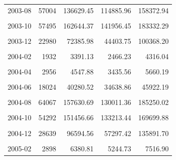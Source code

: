 \begin{longtable}[t]{crrrr}
2003-08 & 57004 & 136629.45 & 114885.96 & 158372.94\\
\cellcolor{gray!10}{2003-09} & \cellcolor{gray!10}{97758} & \cellcolor{gray!10}{305283.59} & \cellcolor{gray!10}{276922.92} & \cellcolor{gray!10}{333644.26}\\
2003-10 & 57495 & 162644.37 & 141956.45 & 183332.29\\
\cellcolor{gray!10}{2003-11} & \cellcolor{gray!10}{35421} & \cellcolor{gray!10}{97129.30} & \cellcolor{gray!10}{75538.30} & \cellcolor{gray!10}{118720.30}\\
2003-12 & 22980 & 72385.98 & 44403.75 & 100368.20\\
\cellcolor{gray!10}{2004-01} & \cellcolor{gray!10}{3883} & \cellcolor{gray!10}{7806.18} & \cellcolor{gray!10}{5963.34} & \cellcolor{gray!10}{9649.03}\\
2004-02 & 1932 & 3391.13 & 2466.23 & 4316.04\\
\cellcolor{gray!10}{2004-03} & \cellcolor{gray!10}{2928} & \cellcolor{gray!10}{6763.17} & \cellcolor{gray!10}{5453.68} & \cellcolor{gray!10}{8072.65}\\
2004-04 & 2956 & 4547.88 & 3435.56 & 5660.19\\
\cellcolor{gray!10}{2004-05} & \cellcolor{gray!10}{6609} & \cellcolor{gray!10}{12522.68} & \cellcolor{gray!10}{11276.84} & \cellcolor{gray!10}{13768.52}\\
2004-06 & 18024 & 40280.52 & 34638.86 & 45922.19\\
\cellcolor{gray!10}{2004-07} & \cellcolor{gray!10}{30356} & \cellcolor{gray!10}{32930.33} & \cellcolor{gray!10}{22640.49} & \cellcolor{gray!10}{43220.17}\\
2004-08 & 64067 & 157630.69 & 130011.36 & 185250.02\\
\cellcolor{gray!10}{2004-09} & \cellcolor{gray!10}{121395} & \cellcolor{gray!10}{397710.45} & \cellcolor{gray!10}{355456.84} & \cellcolor{gray!10}{439964.07}\\
2004-10 & 54292 & 151456.66 & 133213.44 & 169699.88\\
\cellcolor{gray!10}{2004-11} & \cellcolor{gray!10}{45364} & \cellcolor{gray!10}{135278.13} & \cellcolor{gray!10}{101751.35} & \cellcolor{gray!10}{168804.91}\\
2004-12 & 28639 & 96594.56 & 57297.42 & 135891.70\\
\cellcolor{gray!10}{2005-01} & \cellcolor{gray!10}{7057} & \cellcolor{gray!10}{19785.22} & \cellcolor{gray!10}{13758.82} & \cellcolor{gray!10}{25811.61}\\
2005-02 & 2898 & 6380.81 & 5244.73 & 7516.90\\

\end{longtable}
